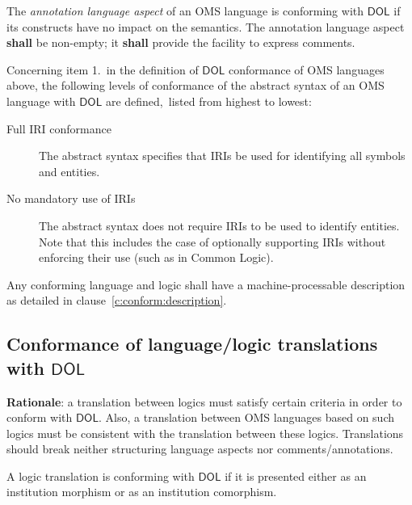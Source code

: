 \documentclass[10pt,fleqn,final]{scrreprt}
\newcommand*{\shall}{\textbf{shall}\xspace}
\newcommand*{\may}{\textbf{may}\xspace}
\newcommand*{\DOL}{\ensuremath{\mathsf{DOL}}\xspace}
\newcommand{\clauserefname}{clause}
\newcommand{\cref}[1]{\clauserefname~\ref{#1}}
\newcommand{\ssclause}[1]{\subsection{#1}}
\begin{document}
The \emph{annotation language aspect} of an OMS language is conforming with \DOL if its constructs
have no impact on the semantics. The annotation language aspect \shall be non-empty; it \shall
provide the facility to express comments.


Concerning item 1.\ in the definition of \DOL conformance of OMS
languages above, the following levels of conformance of the abstract
syntax of an OMS language with \DOL are defined,\ 
listed from highest to lowest:

\begin{description}
\item[Full IRI conformance] The abstract syntax specifies that IRIs be used for
 identifying all symbols and entities.
\item[No mandatory use of IRIs] The abstract syntax does not require  IRIs
 to be used to identify entities. Note that this includes the case of
  optionally supporting IRIs without enforcing their use (such as in Common
  Logic).
\end{description}

Any conforming language and logic shall have a machine-processable description
 as detailed in \cref{c:conform:description}.

\ssclause{Conformance of language/logic translations with \DOL}\label{c:conform:translation}
\begin{fminipage}{\textwidth}
\textbf{Rationale}: a translation between logics must satisfy certain criteria in order to conform with \DOL.
Also, a translation between OMS languages based on such logics must be consistent with the
translation between these logics.  Translations should break neither structuring language aspects nor comments/annotations.
\end{fminipage}

A logic translation is conforming with \DOL if it is presented either as an institution morphism or
as an institution comorphism.  
\end{document}
